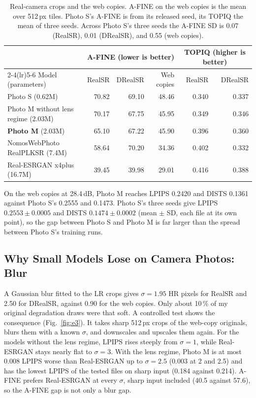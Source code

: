 \documentclass[conference]{IEEEtran}
\begin{document}
\begin{table}[t]
\centering
\caption{Real-camera crops and the web copies. A-FINE on the web copies is the mean over 512\,px tiles. Photo S's A-FINE
is from its released seed, its TOPIQ the mean of three seeds. Across Photo S's three seeds the A-FINE SD is 0.07
(RealSR), 0.01 (DRealSR), and 0.55 (web copies).}
\label{tab:camera}\small
\begin{tabular}{lrrrrr}
\toprule
 & \multicolumn{3}{c}{A-FINE (lower is better)} & \multicolumn{2}{c}{TOPIQ (higher is better)} \\
\cmidrule(lr){2-4}\cmidrule(lr){5-6}
Model (parameters) & RealSR & DRealSR & Web copies & RealSR & DRealSR \\
\midrule
Photo S (0.62M) & 70.82 & 69.10 & 48.46 & 0.340 & 0.337 \\
Photo M without lens regime (2.03M) & 70.17 & 67.75 & 45.95 & 0.349 & 0.346 \\
\textbf{Photo M} (2.03M) & 65.10 & 67.22 & 45.90 & 0.396 & 0.360 \\
NomosWebPhoto RealPLKSR (7.4M) & 58.64 & 70.20 & 34.36 & 0.402 & 0.332 \\
Real-ESRGAN x4plus (16.7M) & 39.45 & 39.98 & 29.01 & 0.416 & 0.388 \\
\bottomrule
\end{tabular}
\end{table}

On the web copies at 28.4\,dB, Photo M reaches LPIPS 0.2420 and DISTS 0.1361 against Photo S's 0.2555 and 0.1473. Photo S's
three seeds give LPIPS $0.2553 \pm 0.0005$ and DISTS $0.1474 \pm 0.0002$ (mean $\pm$ SD, each file at its own point),
so the gap between Photo S and Photo M is far larger than the spread between Photo S's training runs.

\subsection{Why Small Models Lose on Camera Photos: Blur}
\label{sec:blur}
A Gaussian blur fitted to the LR crops gives $\sigma = 1.95$ HR pixels for RealSR and 2.50 for DRealSR, against 0.90
for the web copies. Only about 10\,\% of my original degradation draws were that soft. A controlled test shows the
consequence (Fig.~\ref{fig:e3}). It takes sharp 512\,px crops of the web-copy originals, blurs them with a known
$\sigma$, and downscales and upscales them again. For the models without the lens regime, LPIPS rises steeply from
$\sigma=1$, while Real-ESRGAN stays nearly flat to $\sigma=3$. With the lens regime, Photo M is at most 0.008 LPIPS worse
than Real-ESRGAN up to $\sigma=2.5$ (0.003 at 2 and 2.5) and has the lowest LPIPS of the tested files on sharp
input (0.184 against 0.214). A-FINE prefers Real-ESRGAN at every $\sigma$, sharp input included (40.5 against 57.6),
so the A-FINE gap is not only a blur gap.
\end{document}
